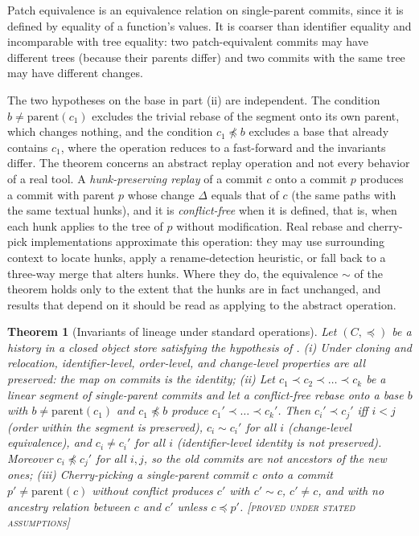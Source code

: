 \documentclass[11pt,twoside,openright]{book}
\theoremstyle{plain}
\newtheorem{theorem}{Theorem}[chapter]
\theoremstyle{definition}
\theoremstyle{remark}
\newcommand{\Proved}{\textup{\textsc{[proved under stated assumptions]}}}
\newcommand{\anc}{\preceq}
\begin{document}
Patch equivalence is an equivalence relation on single-parent commits, since it is defined by equality of a function's values. It is coarser than identifier equality and incomparable with tree equality: two patch-equivalent commits may have different trees (because their parents differ) and two commits with the same tree may have different changes.

The two hypotheses on the base in part (ii) are independent. The condition $b\ne\mathrm{parent}(c_1)$ excludes the trivial rebase of the segment onto its own parent, which changes nothing, and the condition $c_1\not\anc b$ excludes a base that already contains $c_1$, where the operation reduces to a fast-forward and the invariants differ. The theorem concerns an abstract replay operation and not every behavior of a real tool. A \emph{hunk-preserving replay} of a commit $c$ onto a commit $p$ produces a commit with parent $p$ whose change $\Delta$ equals that of $c$ (the same paths with the same textual hunks), and it is \emph{conflict-free} when it is defined, that is, when each hunk applies to the tree of $p$ without modification. Real rebase and cherry-pick implementations approximate this operation: they may use surrounding context to locate hunks, apply a rename-detection heuristic, or fall back to a three-way merge that alters hunks. Where they do, the equivalence $\sim$ of the theorem holds only to the extent that the hunks are in fact unchanged, and results that depend on it should be read as applying to the abstract operation.

\begin{theorem}[Invariants of lineage under standard operations]\label{thm:lineageinv}
Let $(C,\anc)$ be a history in a closed object store satisfying the hypothesis of .
(i) Under cloning and relocation, identifier-level, order-level, and change-level properties are all preserved: the map on commits is the identity; (ii) Let $c_1\prec c_2\prec\dots\prec c_k$ be a linear segment of single-parent commits and let a conflict-free rebase onto a base $b$ with $b\neq\mathrm{parent}(c_1)$ and $c_1\not\anc b$ produce $c_1'\prec\dots\prec c_k'$. Then $c_i'\prec c_j'$ iff $i<j$ (order within the segment is preserved), $c_i\sim c_i'$ for all $i$ (change-level equivalence), and $c_i\neq c_i'$ for all $i$ (identifier-level identity is not preserved). Moreover $c_i\not\anc c_j'$ for all $i,j$, so the old commits are not ancestors of the new ones; (iii) Cherry-picking a single-parent commit $c$ onto a commit $p'\neq\mathrm{parent}(c)$ without conflict produces $c'$ with $c'\sim c$, $c'\ne c$, and with no ancestry relation between $c$ and $c'$ unless $c\anc p'$.
\Proved{}
\end{theorem}
\end{document}
